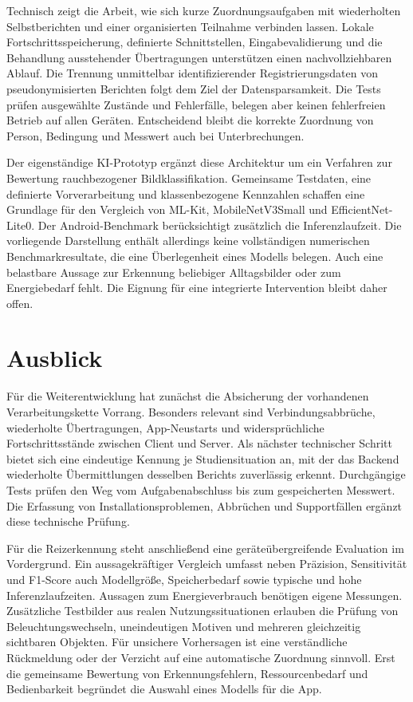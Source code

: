 Technisch zeigt die Arbeit, wie sich kurze Zuordnungsaufgaben mit wiederholten Selbstberichten und einer organisierten Teilnahme verbinden lassen. Lokale Fortschrittsspeicherung, definierte Schnittstellen, Eingabevalidierung und die Behandlung ausstehender Übertragungen unterstützen einen nachvollziehbaren Ablauf. Die Trennung unmittelbar identifizierender Registrierungsdaten von pseudonymisierten Berichten folgt dem Ziel der Datensparsamkeit. Die Tests prüfen ausgewählte Zustände und Fehlerfälle, belegen aber keinen fehlerfreien Betrieb auf allen Geräten. Entscheidend bleibt die korrekte Zuordnung von Person, Bedingung und Messwert auch bei Unterbrechungen.

Der eigenständige KI-Prototyp ergänzt diese Architektur um ein Verfahren zur Bewertung rauchbezogener Bildklassifikation. Gemeinsame Testdaten, eine definierte Vorverarbeitung und klassenbezogene Kennzahlen schaffen eine Grundlage für den Vergleich von ML-Kit, MobileNetV3Small und EfficientNet-Lite0. Der Android-Benchmark berücksichtigt zusätzlich die Inferenzlaufzeit. Die vorliegende Darstellung enthält allerdings keine vollständigen numerischen Benchmarkresultate, die eine Überlegenheit eines Modells belegen. Auch eine belastbare Aussage zur Erkennung beliebiger Alltagsbilder oder zum Energiebedarf fehlt. Die Eignung für eine integrierte Intervention bleibt daher offen.

\section{Ausblick}

Für die Weiterentwicklung hat zunächst die Absicherung der vorhandenen Verarbeitungskette Vorrang. Besonders relevant sind Verbindungsabbrüche, wiederholte Übertragungen, App-Neustarts und widersprüchliche Fortschrittsstände zwischen Client und Server. Als nächster technischer Schritt bietet sich eine eindeutige Kennung je Studiensituation an, mit der das Backend wiederholte Übermittlungen desselben Berichts zuverlässig erkennt. Durchgängige Tests prüfen den Weg vom Aufgabenabschluss bis zum gespeicherten Messwert. Die Erfassung von Installationsproblemen, Abbrüchen und Supportfällen ergänzt diese technische Prüfung.

Für die Reizerkennung steht anschließend eine geräteübergreifende Evaluation im Vordergrund. Ein aussagekräftiger Vergleich umfasst neben Präzision, Sensitivität und F1-Score auch Modellgröße, Speicherbedarf sowie typische und hohe Inferenzlaufzeiten. Aussagen zum Energieverbrauch benötigen eigene Messungen. Zusätzliche Testbilder aus realen Nutzungssituationen erlauben die Prüfung von Beleuchtungswechseln, uneindeutigen Motiven und mehreren gleichzeitig sichtbaren Objekten. Für unsichere Vorhersagen ist eine verständliche Rückmeldung oder der Verzicht auf eine automatische Zuordnung sinnvoll. Erst die gemeinsame Bewertung von Erkennungsfehlern, Ressourcenbedarf und Bedienbarkeit begründet die Auswahl eines Modells für die App.

